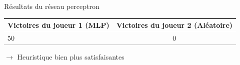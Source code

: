 \documentclass{beamer}
\begin{document}
\begin{frame} {Résultats du réseau perceptron}
    \begin{center}
        \begin{tabular}{ | l | c | }
          \hline
          Victoires du joueur 1 (MLP) & Victoires du joueur 2 (Aléatoire)  \\ \hline
          50 & 0  \\ \hline
        \end{tabular}
      \end{center}

$\rightarrow$ Heuristique bien plus satisfaisantes
\end{frame}
\end{document}
